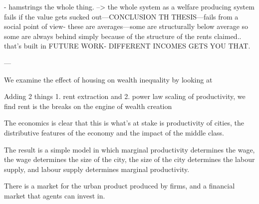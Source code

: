 

- hamstrings the whole thing.
--> the whole system as a welfare producing system fails if the value gets sucked out---CONCLUSION TH THESIS---fails from a social point of view-
these are averages---some are structurally below average so some are always behind simply because of the structure of the rents claimed.. that's built in FUTURE WORK- DIFFERENT INCOMES GETS YOU THAT. 


---


We examine the effect of housing on wealth inequality by looking at 

Adding 2 things 1. rent extraction and 2. power law scaling of productivity, we find rent is the breaks on the engine of wealth creation

The economics is clear that this is what's at stake is productivity of cities, the distributive features of the economy and the impact of the middle class.

The result is a simple model in which marginal productivity determines the wage, the wage determines the size of the city, the size of the city determines the labour supply, and labour supply determines marginal productivity. 

There is a market for the urban product produced by firms, and a financial market that agents can invest in.



